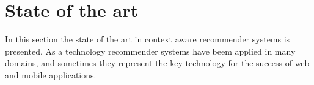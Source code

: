 \chapter{State of the art} \label{stateoftheart}



In this section the state of the art in 
context aware recommender systems is presented. 
As a technology recommender systems have beem applied 
in many domains, and sometimes they represent the  key
technology for the success of web and mobile applications.

% 


